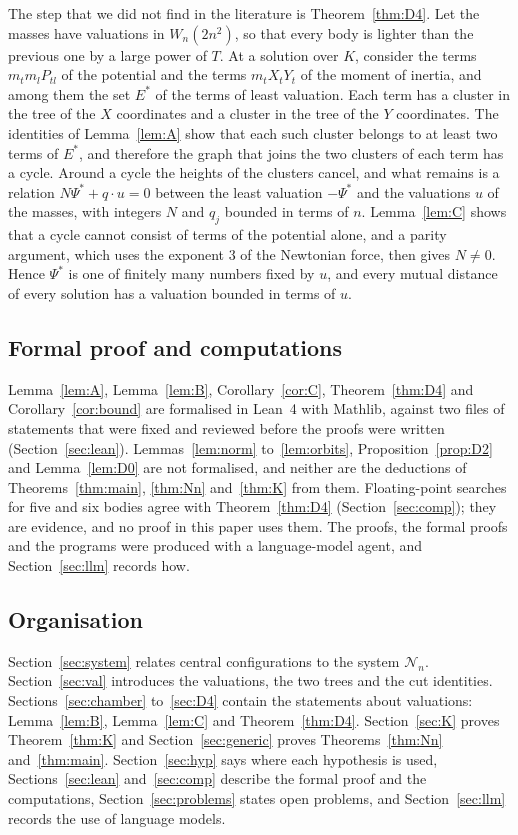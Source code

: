 \documentclass[11pt]{amsart}
\theoremstyle{definition}
\theoremstyle{remark}
\numberwithin{equation}{section}
\newcommand{\cN}{\mathcal{N}}
\newcommand{\Ps}{\Psi^{*}}
\newcommand{\Es}{E^{*}}
\begin{document}
The step that we did not find in the literature is Theorem~\ref{thm:D4}. Let the masses have valuations
in $W_n(2n^2)$, so that every body is lighter than the previous one by a large power of $T$. At a solution
over $K$, consider the terms $m_t m_l P_{tl}$ of the potential and the terms $m_t X_t Y_t$ of the moment
of inertia, and among them the set $\Es$ of the terms of least valuation. Each term has a cluster in the
tree of the $X$ coordinates and a cluster in the tree of the $Y$ coordinates. The identities of
Lemma~\ref{lem:A} show that each such cluster belongs to at least two terms of $\Es$, and therefore the
graph that joins the two clusters of each term has a cycle. Around a cycle the heights of the clusters
cancel, and what remains is a relation $N \Ps + q \cdot u = 0$ between the least valuation $-\Ps$ and the
valuations $u$ of the masses, with integers $N$ and $q_j$ bounded in terms of $n$. Lemma~\ref{lem:C}
shows that a cycle cannot consist of terms of the potential alone, and a parity argument, which uses the
exponent $3$ of the Newtonian force, then gives $N \ne 0$. Hence $\Ps$ is one of finitely many numbers
fixed by $u$, and every mutual distance of every solution has a valuation bounded in terms of $u$.

\subsection*{Formal proof and computations} Lemma~\ref{lem:A}, Lemma~\ref{lem:B}, Corollary~\ref{cor:C},
Theorem~\ref{thm:D4} and Corollary~\ref{cor:bound} are formalised in Lean~4 with Mathlib, against two
files of statements that were fixed and reviewed before the proofs were written
(Section~\ref{sec:lean}). Lemmas~\ref{lem:norm} to~\ref{lem:orbits}, Proposition~\ref{prop:D2} and
Lemma~\ref{lem:D0} are not formalised, and neither are the deductions of Theorems~\ref{thm:main},
\ref{thm:Nn} and~\ref{thm:K} from them. Floating-point searches for five and six bodies agree
with Theorem~\ref{thm:D4} (Section~\ref{sec:comp}); they are evidence, and no proof in this paper uses
them. The proofs, the formal proofs and the programs were produced with a language-model agent, and
Section~\ref{sec:llm} records how.

\subsection*{Organisation} Section~\ref{sec:system} relates central configurations to the system
$\cN_n$. Section~\ref{sec:val} introduces the valuations, the two trees and the cut identities.
Sections~\ref{sec:chamber} to~\ref{sec:D4} contain the statements about valuations: Lemma~\ref{lem:B},
Lemma~\ref{lem:C} and Theorem~\ref{thm:D4}. Section~\ref{sec:K} proves Theorem~\ref{thm:K} and
Section~\ref{sec:generic} proves Theorems~\ref{thm:Nn} and~\ref{thm:main}. Section~\ref{sec:hyp} says
where each hypothesis is used, Sections~\ref{sec:lean} and~\ref{sec:comp} describe the formal proof and
the computations, Section~\ref{sec:problems} states open problems, and Section~\ref{sec:llm} records the
use of language models.
\end{document}
